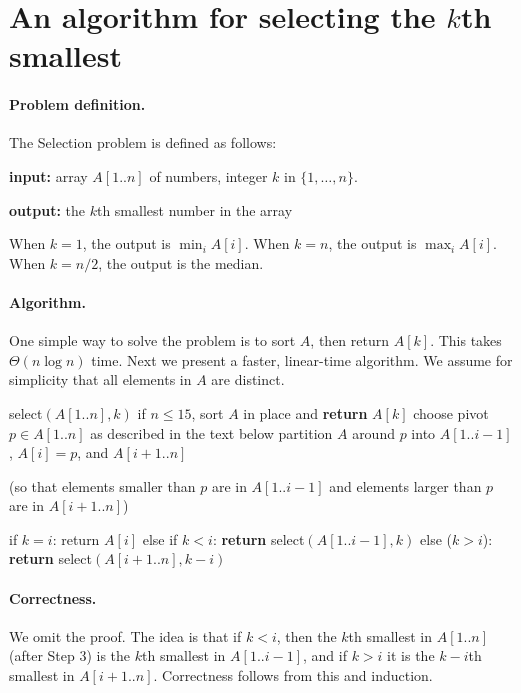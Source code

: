 
\section{An algorithm for selecting the $k$th smallest}\label{dc: sec: selection}

\paragraph{Problem definition.}
The Selection problem is defined as follows:
\begin{mylist}
\item \textbf{input:} array $A[1..n]$ of numbers, integer $k$ in $\{1,\ldots,n\}$.
\item \textbf{output:} the $k$th smallest number in the array
\end{mylist}

When $k=1$, the output is $\min_i A[i]$.
When $k=n$, the output is $\max_i A[i]$.
When $k=n/2$, the output is the median.

\paragraph{Algorithm.}
One simple way to solve the problem is to sort $A$, then return $A[k]$.
This takes $\Theta(n\log n)$ time.
Next we present a faster, linear-time algorithm.
We assume for simplicity that all elements in $A$ are distinct.

\begin{myframed}
\begin{steps}
  \item[] \textsf{select}$(A[1..n], k)$
    \step if $n \le 15$, sort $A$ in place and \textbf{return} $A[k]$
    \step choose pivot $p\in A[1..n]$ as described in the text below
    \step partition $A$ around $p$ into $A[1..i-1]$, $A[i]=p$, and $A[i+1..n]$

    (so that elements smaller than $p$ are in $A[1..i-1]$
    and elements larger than $p$ are in $A[i+1..n]$)
  
    \step if $k=i$: return $A[i]$
    \step else if $k<i$: \textbf{return} \textsf{select}$(A[1..i-1], k)$ 
    \step else ($k>i$): \textbf{return} \textsf{select}$(A[i+1..n], k-i)$ 
  \end{steps}
\end{myframed}

\paragraph{Correctness.}
We omit the proof.
The idea is that if $k<i$, then the $k$th smallest in $A[1..n]$ (after Step 3)
is the $k$th smallest in $A[1..i-1]$,
and if $k>i$ it is the $k-i$th smallest in $A[i+1..n]$.
Correctness follows from this and induction.

